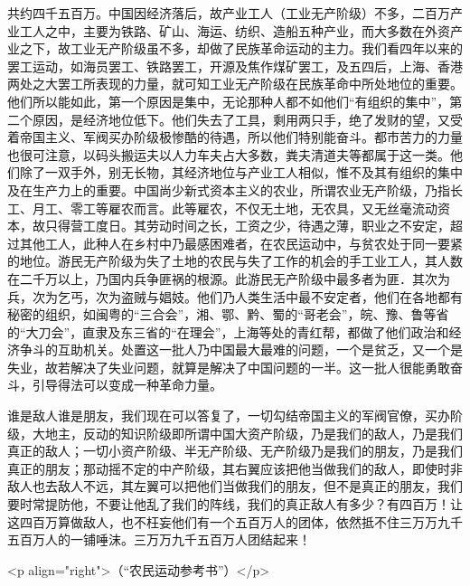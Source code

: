 共约四千五百万。中国因经济落后，故产业工人（工业无产阶级）不多，二百万产业工人之中，主要为铁路、矿山、海运、纺织、造船五种产业，而大多数在外资产业之下，故工业无产阶级虽不多，却做了民族革命运动的主力。我们看四年以来的罢工运动，如海员罢工、铁路罢工，开源及焦作煤矿罢工，及五四后，上海、香港两处之大罢工所表现的力量，就可知工业无产阶级在民族革命中所处地位的重要。他们所以能如此，第一个原因是集中，无论那种人都不如他们“有组织的集中”，第二个原因，是经济地位低下。他们失去了工具，剩用两只手，绝了发财的望，又受着帝国主义、军阀买办阶级极惨酷的待遇，所以他们特别能奋斗。都市苦力的力量也很可注意，以码头搬运夫以人力车夫占大多数，粪夫清道夫等都属于这一类。他们除了一双手外，别无长物，其经济地位与产业工人相似，惟不及其有组织的集中及在生产力上的重要。中国尚少新式资本主义的农业，所谓农业无产阶级，乃指长工、月工、零工等雇农而言。此等雇农，不仅无土地，无农具，又无丝毫流动资本，故只得营工度日。其劳动时间之长，工资之少，待遇之薄，职业之不安定，超过其他工人，此种人在乡村中乃最感困难者，在农民运动中，与贫农处于同一要紧的地位。游民无产阶级为失了土地的农民与失了工作的机会的手工业工人，其人数在二千万以上，乃国内兵争匪祸的根源。此游民无产阶级中最多者为匪．其次为兵，次为乞丐，次为盗贼与娼妓。他们乃人类生活中最不安定者，他们在各地都有秘密的组织，如闽粤的“三合会”，湘、鄂、黔、蜀的“哥老会”，皖、豫、鲁等省的“大刀会”，直隶及东三省的“在理会”，上海等处的青红帮，都做了他们政治和经济争斗的互助机关。处置这一批人乃中国最大最难的问题，一个是贫乏，又一个是失业，故若解决了失业问题，就算是解决了中国问题的一半。这一批人很能勇敢奋斗，引导得法可以变成一种革命力量。

谁是敌人谁是朋友，我们现在可以答复了，一切勾结帝国主义的军阀官僚，买办阶级，大地主，反动的知识阶级即所谓中国大资产阶级，乃是我们的敌人，乃是我们真正的敌人；一切小资产阶级、半无产阶级、无产阶级乃是我们的朋友，乃是我们真正的朋友；那动摇不定的中产阶级，其右翼应该把他当做我们的敌人，即使时非敌人也去敌人不远，其左翼可以把他们当做我们的朋友，但不是真正的朋友，我们要时常提防他，不要让他乱了我们的阵线，我们的真正敌人有多少？有四百万！让这四百万算做敌人，也不枉妄他们有一个五百万人的团体，依然抵不住三万万九千五百万人的一铺唾沫。三万万九千五百万人团结起来！

<p align="right">（“农民运动参考书”）</p>

